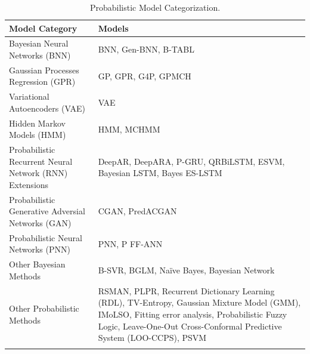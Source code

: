 \begin{table}[H]
    \centering
    \caption[Model Categorization]{Probabilistic Model Categorization.}
    \label{table:model_categorization}
    \small
    \begin{adjustbox}{width=0.5\textwidth,center}
    \begin{tabular}{p{}p{}}
        \toprule
        \textbf{Model Category} & \textbf{Models} \\
        \midrule
        Bayesian Neural Networks (BNN) & BNN, Gen-BNN, B-TABL \\
        \addlinespace
        \hdashline[0.2pt/3pt]
        \addlinespace
        Gaussian Processes Regression (GPR) & GP, GPR, G4P, GPMCH \\
        \addlinespace
        \hdashline[0.2pt/3pt]
        \addlinespace
        Variational Autoencoders (VAE) & VAE \\
        \addlinespace
        \hdashline[0.2pt/3pt]
        \addlinespace
        Hidden Markov Models (HMM) & HMM, MCHMM \\
        \addlinespace
        \hdashline[0.2pt/3pt]
        \addlinespace
        Probabilistic Recurrent Neural Network (RNN) Extensions & DeepAR, DeepARA, P-GRU, QRBiLSTM, ESVM, Bayesian LSTM, Bayes ES-LSTM \\
        \addlinespace
        \hdashline[0.2pt/3pt]
        \addlinespace
        Probabilistic Generative Adversial Networks (GAN) & CGAN, PredACGAN \\
        \addlinespace
        \hdashline[0.2pt/3pt]
        \addlinespace
        Probabilistic Neural Networks (PNN) & PNN, P FF-ANN \\
        \addlinespace
        \hdashline[0.2pt/3pt]
        \addlinespace
        Other Bayesian Methods & B-SVR, BGLM, Naïve Bayes, Bayesian Network \\
        \addlinespace
        \hdashline[0.2pt/3pt]
        \addlinespace
        Other Probabilistic Methods & RSMAN, PLPR, Recurrent Dictionary Learning (RDL), TV-Entropy, Gaussian Mixture Model (GMM), IMoLSO, Fitting error analysis, Probabilistic Fuzzy Logic, Leave-One-Out Cross-Conformal Predictive System (LOO-CCPS), PSVM  \\
        \addlinespace
        \addlinespace
        \bottomrule
    \end{tabular}
    \end{adjustbox}
\end{table}

